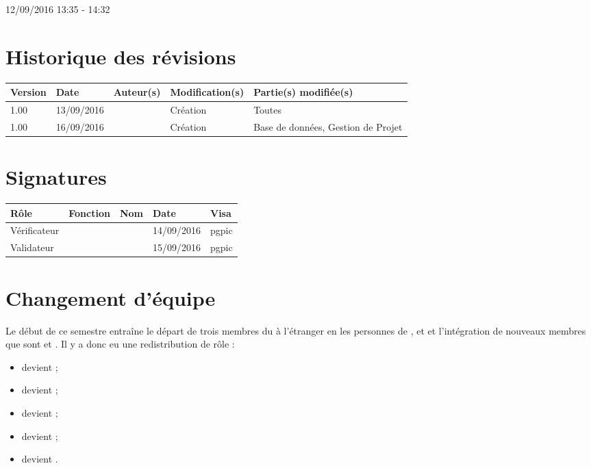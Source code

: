 \documentclass [a4paper] {article}
\begin{document}
12/09/2016			 				%
\hfill   
\hfill 	 13:35 - 14:32				%


\section*{Historique des révisions}
\begin{center}
			\begin{tabular}{| p{2.5cm} | p{3cm} | p{3cm} | p{3cm} | p{3.5cm} |}
				\hline
				\rowcolor{Gray}
				Version & Date & Auteur(s) & Modification(s) & Partie(s) modifiée(s)		 \\
				\hline
				1.00 & 13/09/2016 & \Kafui & Création & Toutes \\
				\hline	
				1.00 & 16/09/2016 & \Kafui & Création & Base de données, Gestion de Projet \\
				\hline		
			\end{tabular}
		\end{center}

\section*{Signatures}

		\begin{center}
			\begin{tabular}{| p{2.5cm} | p{4cm} | p{3cm} | p{3cm} | p{2.5cm} |}
				\hline
				\rowcolor{Gray}
				Rôle & Fonction & Nom & Date & Visa		 \\
				\hline
				Vérificateur & \RGC & \Melissa &  14/09/2016 & pgpic \\[30pt]
				\hline
				Validateur & \CP & \Pierre &  15/09/2016 & pgpic \\[30pt]	
				\hline
			\end{tabular}
		\end{center}

\section{Changement d'équipe}
Le début de ce semestre entraîne le départ de trois membres du \PICCourt à l'étranger en les personnes de \Mathieu, \Michel{} et \Sergi{} et l'intégration de nouveaux membres que sont \Francois{} et \Juliana. Il y a donc eu une redistribution de rôle :
\begin{itemize}
\item \Pierre{} devient \CP;
\item \Francois{} devient \CPA;
\item \Kafui{} devient \RQ;
\item \Julie{} devient \RD;
\item \Melissa{} devient \RGC.
\end{itemize}
\end{document}
